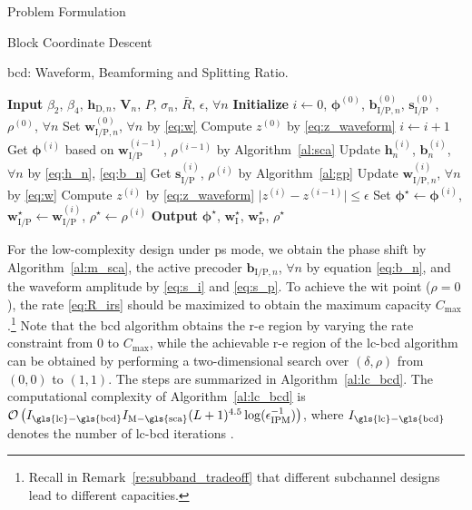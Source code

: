 \begin{section}{Problem Formulation}
\begin{subsection}{Block Coordinate Descent}
		\begin{algorithm}[!t]
			\caption{\gls{bcd}: Waveform, Beamforming and Splitting Ratio.}
			\label{al:bcd}
			\begin{algorithmic}[1]
				\State \textbf{Input} $\beta_2$, $\beta_4$, $\mathbf{h}_{\mathrm{D},n}$, $\mathbf{V}_{n}$, $P$, $\sigma_n$, $\bar{R}$, $\epsilon$, $\forall n$
				\State \textbf{Initialize} $i \gets 0$, $\mathbf{\phi}^{(0)}$, $\mathbf{b}_{\mathrm{I/P},n}^{(0)}$, $\mathbf{s}_{\mathrm{I/P}}^{(0)}$, $\rho^{(0)}$, $\forall n$
				\State Set $\mathbf{w}_{\mathrm{I/P},n}^{(0)}$, $\forall n$ by \eqref{eq:w}
				\State Compute $z^{(0)}$ by \eqref{eq:z_waveform}
				\Repeat
					\State $i \gets i + 1$
					\State Get $\mathbf{\phi}^{(i)}$ based on $\mathbf{w}_{\mathrm{I/P}}^{(i-1)}$, $\rho^{(i-1)}$ by Algorithm~\ref{al:sca}
					\State Update $\mathbf{h}_n^{(i)}$, $\mathbf{b}_n^{(i)}$, $\forall n$ by \eqref{eq:h_n}, \eqref{eq:b_n}
					\State Get $\mathbf{s}_{\mathrm{I/P}}^{(i)}$, $\rho^{(i)}$ by Algorithm~\ref{al:gp}
					\State Update $\mathbf{w}_{\mathrm{I/P},n}^{(i)}$, $\forall n$ by \eqref{eq:w}
					\State Compute $z^{(i)}$ by \eqref{eq:z_waveform}
				\Until $\lvert z^{(i)} - z^{(i-1)} \rvert \le \epsilon$
				\State Set $\mathbf{\phi}^{\star} \gets \mathbf{\phi}^{(i)}$, $\mathbf{w}_{\mathrm{I/P}}^{\star} \gets \mathbf{w}_{\mathrm{I/P}}^{(i)}$, $\rho^{\star} \gets \rho^{(i)}$
				\State \textbf{Output} $\mathbf{\phi}^{\star}$, $\mathbf{w}_{\mathrm{I}}^{\star}$, $\mathbf{w}_{\mathrm{P}}^{\star}$, $\rho^{\star}$
			\end{algorithmic}
		\end{algorithm}

		For the low-complexity design under \gls{ps} mode, we obtain the phase shift by Algorithm~\ref{al:m_sca}, the active precoder $\mathbf{b}_{\mathrm{I/P},n}$, $\forall n$ by equation \eqref{eq:b_n}, and the waveform amplitude by \eqref{eq:s_i} and \eqref{eq:s_p}. To achieve the \gls{wit} point ($\rho=0$), the rate \eqref{eq:R_irs} should be maximized to obtain the maximum capacity $C_{\max}$.\footnote{Recall in Remark~\ref{re:subband_tradeoff} that different subchannel designs lead to different capacities.} Note that the \gls{bcd} algorithm obtains the \gls{r-e} region by varying the rate constraint from \num{0} to $C_{\max}$, while the achievable \gls{r-e} region of the \gls{lc}-\gls{bcd} algorithm can be obtained by performing a two-dimensional search over $(\delta, \rho)$ from $(0, 0)$ to $(1, 1)$. The steps are summarized in Algorithm~\ref{al:lc_bcd}. The computational complexity of Algorithm~\ref{al:lc_bcd} is $\mathcal{O}\left(I_{\mathrm{\gls{lc}-\gls{bcd}}}I_{\mathrm{M-\gls{sca}}}(L+1)^{4.5} \log(\epsilon_{\mathrm{IPM}}^{-1})\right)$, where $I_{\mathrm{\gls{lc}-\gls{bcd}}}$ denotes the number of \gls{lc}-\gls{bcd} iterations \cite{Luo2010b}.


\end{subsection}
\end{section}
